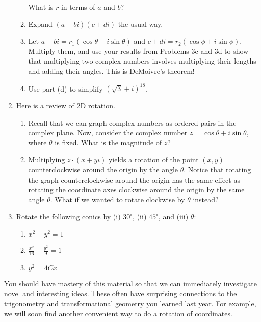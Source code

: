 \documentclass[../gatm.tex]{subfiles}
\begin{document}
\begin{enumerate}
\begin{enumerate}
What is $r$ in terms of $a$ and $b$?
\item Expand $(a+bi)(c+di)$ the usual way.
\item Let $a+bi=r_1(\cos\theta + i\sin\theta)$ and $c+di=r_2(\cos\phi + i\sin\phi)$. Multiply them, and use your results from Problems 3c and 3d to show that multiplying two complex numbers involves multiplying their lengths and adding their angles. This is DeMoivre's theorem!
\item Use part (d) to simplify $(\sqrt{3}+i)^{18}$.
\end{enumerate}
\item Here is a review of 2D rotation.
\begin{enumerate}
\item Recall that we can graph complex numbers as ordered pairs in the complex plane. Now, consider the complex number $z=\cos \theta + i\sin\theta$, where $\theta$ is fixed. What is the magnitude of $z$?
\item Multiplying $z\cdot(x+yi)$ yields a rotation of the point $(x,y)$ counterclockwise around the origin by the angle $\theta$. Notice that rotating the graph counterclockwise around the origin has the same effect as rotating the coordinate axes clockwise around the origin by the same angle $\theta$. What if we wanted to rotate clockwise by $\theta$ instead?
\end{enumerate}
\item Rotate the following conics by (i) $30^\circ$, (ii) $45^\circ$, and (iii) $\theta$:
\begin{multicols}{3}
\begin{enumerate}
\item $x^2-y^2=1$
\item $\frac{x^2}{16}-\frac{y^2}{9}=1$
\item $y^2=4Cx$
\end{enumerate}
\end{multicols}
\end{enumerate}

You should have mastery of this material so that we can immediately investigate novel and interesting ideas. These often have surprising connections to the trigonometry and transformational geometry you learned last year. For example, we will soon find another convenient way to do a rotation of coordinates.
\end{document}
